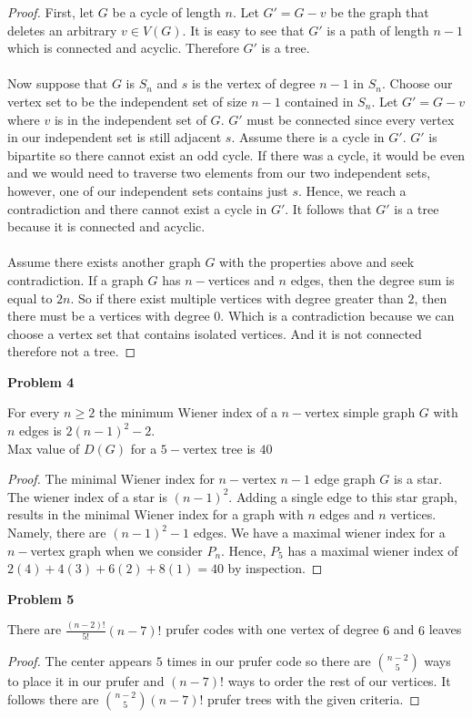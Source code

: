 \documentclass{article}
\newenvironment{claim}[2][Claim]{\begin{trivlist}
		\item[\hskip \labelsep {\bfseries #1}\hskip \labelsep {\bfseries #2}]}{\end{trivlist}}
\begin{document}
\begin{proof}
	First, let $G$ be a cycle of length $n$. Let $G' = G - v$ be the graph that deletes an arbitrary $v \in V(G)$. It is easy to see that $G'$ is a path of length $n - 1$ which is connected and acyclic. Therefore $G'$ is a tree.\\ \\
	Now suppose that $G$ is $S_n$ and $s$ is the vertex of degree $n - 1$ in $S_n$. Choose our vertex set to be the independent set of size $n - 1$ contained in $S_n$. Let $G' = G - v$ where $v$ is in the independent set of $G$. $G'$ must be connected since every vertex in our independent set is still adjacent $s$. Assume there is a cycle in $G'$. $G'$ is bipartite so there cannot exist an odd cycle. If there was a cycle, it would be even and we would need to traverse two elements from our two independent sets, however, one of our independent sets contains just $s$.	Hence, we reach a contradiction and there cannot exist a cycle in $G'$. It follows that $G'$ is a tree because it is connected and acyclic.\\ \\
	Assume there exists another graph $G$ with the properties above and seek contradiction. 
	If a graph $G$ has $n-$vertices and $n$ edges, then the degree sum is equal to $2n$. So if there exist multiple vertices with degree greater than $2$, then there must be a vertices with degree $0$. Which is a contradiction because we can choose a vertex set that contains isolated vertices. And it is not connected therefore not a tree.
\end{proof}

\noindent \textbf{Problem 4}
\begin{claim}{}
	For every $n \geq 2$ the minimum Wiener index of a $n-$vertex simple graph $G$ with $n$ edges is $2(n-1)^2 - 2$. \\
	Max value of $D(G)$ for a $5-$vertex tree is $40$
\end{claim}
\begin{proof}
	The minimal Wiener index for $n-$vertex $n-1$ edge graph $G$ is a star. The wiener index of a star is $(n-1)^2$. Adding a single edge to this star graph, results in the minimal Wiener index for a graph with $n$ edges and $n$ vertices. Namely, there are $(n-1)^2 - 1$ edges.
	We have a maximal wiener index for a $n-$vertex graph when we consider $P_n$. Hence, $P_5$ has a maximal wiener index of $2(4) + 4(3) + 6(2) + 8(1) = 40$ by inspection.
\end{proof}

\noindent \textbf{Problem 5}
\begin{claim}{}
	There are $\frac{(n - 2)!}{5!}(n - 7)!$ prufer codes with one vertex of degree $6$ and $6$ leaves
\end{claim}
\begin{proof}
	The center appears $5$ times in our prufer code so there are $\binom{n-2}{5}$ ways to place it in our prufer and $(n-7)!$ ways to order the rest of our vertices. It follows there are $\binom{n-2}{5}(n-7)!$ prufer trees with the given criteria.
\end{proof}
\end{document}
